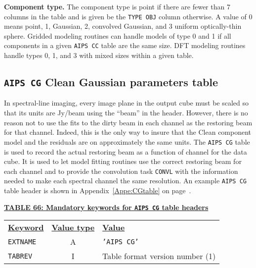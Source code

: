 \documentclass[twoside]{article}
\begin{document}
{\bf Component type.} The component type is point if there are fewer
than 7 columns in the table and is given be the {\tt TYPE OBJ} column
otherwise.  A value of 0 means point, 1, Gaussian, 2, convolved
Gaussian, and 3 uniform optically-thin sphere.  Gridded modeling
routines can handle models of type 0 and 1 if all components in a
given {\tt AIPS CC} table are the same size.  DFT modeling routines
handle types 0, 1, and 3 with mixed sizes within a given table.

\subsection{{\tt AIPS CG} Clean Gaussian parameters table}
\label{s:CG}

In spectral-line imaging, every image plane in the output cube must be
scaled so that its units are Jy/beam using the ``beam'' in the header.
However, there is no reason not to use the fits to the dirty beam in
each channel as the restoring beam for that channel.  Indeed, this is
the only way to insure that the Clean component model and the
residuals are on approximately the same units.  The {\tt AIPS CG}
table is used to record the actual restoring beam as a function of
channel for the data cube.  It is used to let model fitting routines
use the correct restoring beam for each channel and to provide the
convolution task {\tt CONVL} with the information needed to make each
spectral channel the same resolution.  An example {\tt AIPS CG} table
header is shown in Appendix~\ref{Appe:CGtable} on
page~\pageref{Appe:CGtable}.

\begin{center}
\underline{\bf{TABLE 66: Mandatory keywords for {\tt AIPS CG} table
    headers}}\\
\begin{tabular}{lcl}
\noalign{\vspace{2pt}} \label{ta:CGkeys}
\underline{{\bf Keyword}} & \underline{\bf{Value type}} &
    \underline{\bf{Value\vphantom{y}}} \\
\noalign{\vspace{2pt}}
{\tt EXTNAME}   & A & {\tt 'AIPS CG'}  \\
{\tt TABREV}    & I & Table format version number (1)
\end{tabular}
\end{center}
\end{document}
